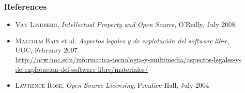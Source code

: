 \begin{frame}
\frametitle{References}

\begin{itemize}
\item \textsc{Van Lindberg}, \textit{Intellectual Property and Open Source}, O'Reilly, July 2008.
\item \textsc{Malcolm Bain} et al. \textit{Aspectos legales y de explotación del software libre}, UOC, February 2007. \\
{\footnotesize \url{http://ocw.uoc.edu/informatica-tecnologia-y-multimedia/aspectos-legales-y-de-explotacion-del-software-libre/materiales/}}
\item \textsc{Lawrence Rose}, \textit{Open Source Licensing}, Prentice Hall, July 2004 

\end{itemize}

\end{frame}





